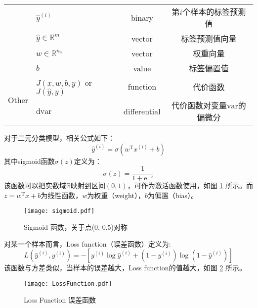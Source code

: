 \begin{table}[htb!]
\begin{threeparttable}
\begin{tabular}{clcc}
                                    & $\hat{y}^{(i)}$                           & binary               & 第$i$个样本的标签预测值                                                  \\
                                    & $\hat{y} \in {\mathbb{R}^{m}}$            & vector               & 标签预测值向量   					                                     \\
                                    & $w \in \mathbb{R}^{n_x}$                  & vector               & 权重向量                                                                \\
                                    & $b$                                       & value                & 标签偏置值                                                            \\ \hline
        \multirow{2}{*}{Other}      & $J(x,w,b,y)$ or $J(\hat{y},y)$            & function             & 代价函数                                                               \\
                                    & $\mathrm{d}\mathrm{var}$                  & differential         & 代价函数对变量$\mathrm{var}$的偏微分                                    \\ \hline
    \end{tabular}
    \label{tab:notations_LR}
    \end{threeparttable}
\end{table}

对于二元分类模型，相关公式如下：
\begin{equation}
    \hat{y}^{(i)} = \sigma(w^\mathrm{T} x^{(i)} + b) \label{eq:logistic}
\end{equation}
其中sigmoid函数$\sigma(z)$定义为：
\begin{equation}
    \sigma(z) = \frac{1}{1 + \mathrm{e}^{-z}} \label{eq:sigmoid}
\end{equation}
该函数可以把实数域$\mathbb{R}$映射到区间$(0, 1)$，可作为激活函数使用，如图 \ref{fig:sigmoid} 所示。而$z = w^\mathrm{T} x + b$为线性函数，$w$为权重（weight），$b$为偏置（bias）。
\begin{figure}[h!b]
    \centering
    \texttt{[image: sigmoid.pdf]}
    \caption{Sigmoid 函数，关于点(0, 0.5)对称}
    \label{fig:sigmoid}
\end{figure}

\vspace{0.5\baselineskip}
对某一个样本而言，Loss function（误差函数）定义为:
\begin{equation}
    L(\hat{y}^{(i)}, y^{(i)}) = -\left[y^{(i)} \log \hat{y}^{(i)} + (1 - y^{(i)}) \log (1 - \hat{y}^{(i)})\right] \label{eq:loss}
\end{equation}
该函数与方差类似，当样本的误差越大，Loss function的值越大，如图 \ref{fig:loss} 所示。
\begin{figure}[h!b]
    \centering
    \texttt{[image: LossFunction.pdf]}
    \caption{Loss Function 误差函数}
    \label{fig:loss}
\end{figure}

